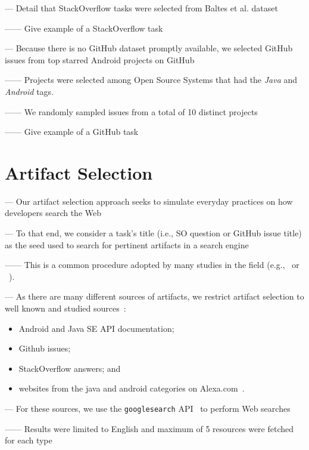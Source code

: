--- Detail that StackOverflow tasks were selected from Baltes et al. dataset~\cite{baltes2019-rep}

------ Give example of a StackOverflow task 


\clearpage

--- Because there is no GitHub dataset promptly available, we selected GitHub issues from top starred Android projects on GitHub 

------ Projects were selected among Open Source Systems that had the \textit{Java} and \textit{Android} tags. 

------ We randomly sampled issues from a total of 10 distinct projects

------ Give example of a GitHub task 

\section{Artifact Selection}


--- Our artifact selection approach seeks to simulate everyday practices on how developers search the Web~\cite{rao2020, Xia2017} \vspace{3mm}

--- To that end, we consider a task's title (i.e., SO question or GitHub issue title) as the seed used to search for pertinent artifacts in a search engine

------ This is a common procedure adopted by many studies in the field (e.g.,~\cite{Xu2017} or ~\cite{Silva2019}). \vspace{3mm}


--- As there are many different sources of artifacts, we restrict artifact selection to well known and studied sources~\cite{Starke2009,Kevic2014, Li2013}:


\begin{itemize}
    \item Android and Java SE API documentation;
    \item Github issues;
    \item StackOverflow answers; and
    \item websites from the java and android categories on Alexa.com~\cite{alexa}.
\end{itemize}


\vspace{3mm}

--- For these sources, we use the \texttt{googlesearch} API~\cite{googlesearch} to perform Web searches

------ Results were limited to English and maximum of 5 resources were fetched for each type

